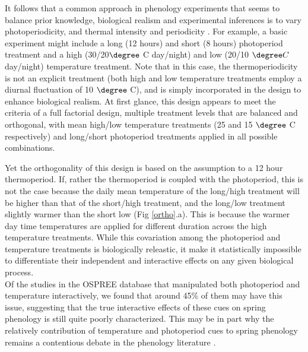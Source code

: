 \documentclass[11pt]{article}
\begin{document}
It follows that a common approach in phenology experiments that seems to balance prior knowledge, biological realism and experimental inferences is to vary photoperiodicity, and thermal intensity and periodicity \citep{}. For example, a basic experiment might include a long (12 hours) and short (8 hours) photoperiod treatment and a high (30/20$\degree$ C day/night) and low (20/10 $\degree C$ day/night) temperature treatment. Note that in this case, the thermoperiodicity is not an explicit treatment (both high and low temperature treatments employ a diurnal fluctuation of 10 $\degree$ C), and is simply incorporated in the design to enhance biological realism. At first glance, this design appears to meet the criteria of a full factorial design, multiple treatment levels that are balanced and orthogonal, with mean high/low temperature treatments (25 and 15 $\degree$ C respectively) and long/short photoperiod treatments applied in all possible combinations.

Yet the orthogonality of this design is based on the assumption to a 12 hour thermoperiod. If, rather the thermoperiod is coupled with the photoperiod, this is not the case because the daily mean temperature of the long/high treatment will be higher than that of the short/high treatment, and the long/low treatment slightly warmer than the short low (Fig \ref{ortho}.a). This is because the warmer day time temperatures are applied for different duration across the high temperature treatments. While this covariation among the photoperiod and temperature treatments is biologically releastic, it make it statistically impossible to differentiate their independent and interactive effects on any given biological process.\\

Of the studies in the OSPREE database that manipulated both photoperiod and temperature interactively, we found that around 45\% of them may have this issue, suggesting that the true interactive effects of these cues on spring phenology is still quite poorly characterized. This may be in part why the relatively contribution of temperature and photoperiod cues to spring phenology remains a contentious debate in the phenology literature \citep{}.
\end{document}
